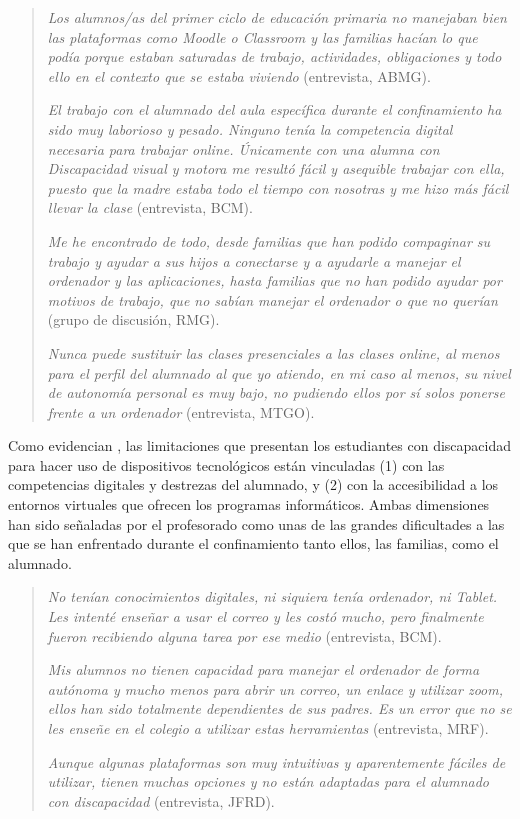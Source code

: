 \documentclass[spanish]{textolivre}
\begin{document}
\begin{quote}
\emph{Los alumnos/as del primer ciclo de educación primaria no manejaban bien las plataformas como Moodle o Classroom y las familias hacían lo que podía porque estaban saturadas de trabajo, actividades, obligaciones y todo ello en el contexto que se estaba viviendo} (entrevista, ABMG).

\emph{El trabajo con el alumnado del aula específica durante el confinamiento ha sido muy laborioso y pesado. Ninguno tenía la competencia digital necesaria para trabajar online. Únicamente con una alumna con Discapacidad visual y motora me resultó fácil y asequible trabajar con ella, puesto que la madre estaba todo el tiempo con nosotras y me hizo más fácil llevar la clase} (entrevista, BCM).

\emph{Me he encontrado de todo, desde familias que han podido compaginar su trabajo y ayudar a sus hijos a conectarse y a ayudarle a manejar el ordenador y las aplicaciones, hasta familias que no han podido ayudar por motivos de trabajo, que no sabían manejar el ordenador o que no querían} (grupo de discusión, RMG).

\emph{Nunca puede sustituir las clases presenciales a las clases online, al menos para el perfil del alumnado al que yo atiendo, en mi caso al menos, su nivel de autonomía personal es muy bajo, no pudiendo ellos por sí solos ponerse frente a un ordenador} (entrevista, MTGO).
\end{quote}

Como evidencian \textcite{vega2020}, %
las limitaciones que presentan los estudiantes con discapacidad para hacer uso de dispositivos tecnológicos están vinculadas (1) con las competencias digitales y destrezas del alumnado, y (2) con la accesibilidad a los entornos virtuales que ofrecen los programas informáticos. Ambas dimensiones han sido señaladas por el profesorado como unas de las grandes dificultades a las que se han enfrentado durante el confinamiento tanto ellos, las familias, como el alumnado.

\begin{quote}
\emph{No tenían conocimientos digitales, ni siquiera tenía ordenador, ni Tablet. Les intenté enseñar a usar el correo y les costó mucho, pero finalmente fueron recibiendo alguna tarea por ese medio} (entrevista, BCM).

\emph{Mis alumnos no tienen capacidad para manejar el ordenador de forma autónoma y mucho menos para abrir un correo, un enlace y utilizar zoom, ellos han sido totalmente dependientes de sus padres. Es un error que no se les enseñe en el colegio a utilizar estas herramientas} (entrevista, MRF).

\emph{Aunque algunas plataformas son muy intuitivas y aparentemente fáciles de utilizar, tienen muchas opciones y no están adaptadas para el alumnado con discapacidad} (entrevista, JFRD).
\end{quote}
\end{document}
